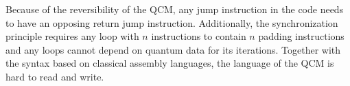 Because of the reversibility of the QCM, any jump instruction in the code needs to have an opposing return jump instruction. Additionally, the synchronization principle requires any loop with $n$ instructions to contain $n$ padding instructions and any loops cannot depend on quantum data for its iterations. Together with the syntax based on classical assembly languages, the language of the QCM is hard to read and write. 

